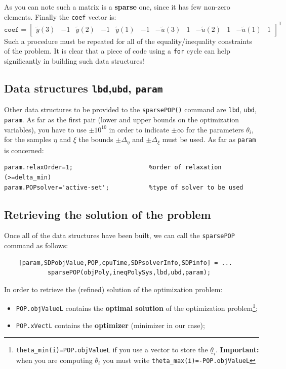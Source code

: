 \noindent
As you can note such a matrix is a \textbf{sparse} one, since it has few non-zero elements. Finally the \texttt{coef} vector is:
{{
    \begin{equation*}
        \texttt{coef}=\begin{bmatrix}
            \tilde{y}(3)&-1& \tilde{y}(2)& -1 &\tilde{y}(1) & -1& -\tilde{u}(3) & 1& -\tilde{u}(2) & 1 & -\tilde{u}(1) & 1
        \end{bmatrix}^\textsf{T}
    \end{equation*}
}}
Such a procedure must be repeated for all of the equality/inequality constraints of the problem. It is clear that a piece of code using a \texttt{for} cycle can help significantly in building such data structures! 

\subsection{Data structures \texttt{lbd},\texttt{ubd}, \texttt{param} }
\noindent
Other data structures to be provided to the \texttt{sparsePOP()} command are \texttt{lbd}, \texttt{ubd}, \texttt{param}. As far as the first pair (lower and upper bounds on the optimization variables), you have to use $\pm{10}^{10}$ in order to indicate $\pm{\infty}$ for the parameters $\theta_i$, for the samples $\eta$ and $\xi$ the bounds $\pm\Delta_\eta$ and $\pm\Delta_\xi$ must be used. As far as \texttt{param} is concerned:
\begin{verbatim}
param.relaxOrder=1;                     %order of relaxation (>=delta_min)
param.POPsolver='active-set';           %type of solver to be used
\end{verbatim}

\subsection{Retrieving the solution of the problem}
Once all of the data structures have been built, we can call the \texttt{sparsePOP} command as follows: 
\begin{verbatim}
    [param,SDPobjValue,POP,cpuTime,SDPsolverInfo,SDPinfo] = ...
            sparsePOP(objPoly,ineqPolySys,lbd,ubd,param);
\end{verbatim}

\noindent
In order to retrieve the (refined) solution of the optimization problem:
\begin{itemize}
    \itemsep0em
    \item \texttt{POP.objValueL} contains the \textbf{optimal solution} of the optimization problem\footnote{\texttt{theta\_min(i)=POP.objValueL} if you use a vector to store the $\underline{\theta}_i$. \textbf{Important: } when you are computing $\overline{\theta}_i$ you must write \texttt{theta\_max(i)=-POP.objValueL}};
    \item \texttt{POP.xVectL} contains the \textbf{optimizer} (minimizer in our case); 
\end{itemize}


 